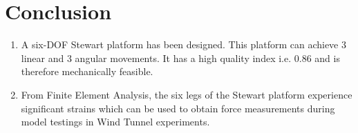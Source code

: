 \chapter{Conclusion}
\begin{enumerate}
\item A six-DOF Stewart platform has been designed. This platform can achieve 3 linear and 3 angular movements. It has a high quality index i.e. 0.86 and is therefore mechanically feasible.
\item From Finite Element Analysis, the six legs of the Stewart platform experience significant strains which can be used to obtain force measurements during model testings in Wind Tunnel experiments.
\end{enumerate}


